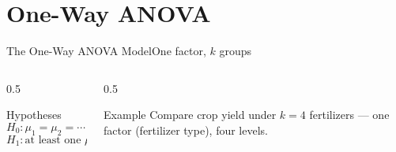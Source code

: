 \documentclass[aspectratio=169,11pt]{beamer}
\begin{document}
\section{One-Way ANOVA}

\begin{frame}{The One-Way ANOVA Model}{One factor, $k$ groups}
  \begin{columns}[T]
    \begin{column}{0.5\textwidth}
      \begin{block}{Hypotheses}
        \[ H_0: \mu_1=\mu_2=\cdots=\mu_k \]
        \[ H_1: \text{at least one } \mu_i \text{ differs} \]
      \end{block}
    \end{column}
    \begin{column}{0.5\textwidth}
      \begin{exampleblock}{Example}
        \small Compare crop yield under $k=4$ fertilizers — one factor
        (fertilizer type), four levels.
      \end{exampleblock}
    \end{column}
  \end{columns}
\end{frame}
\end{document}

